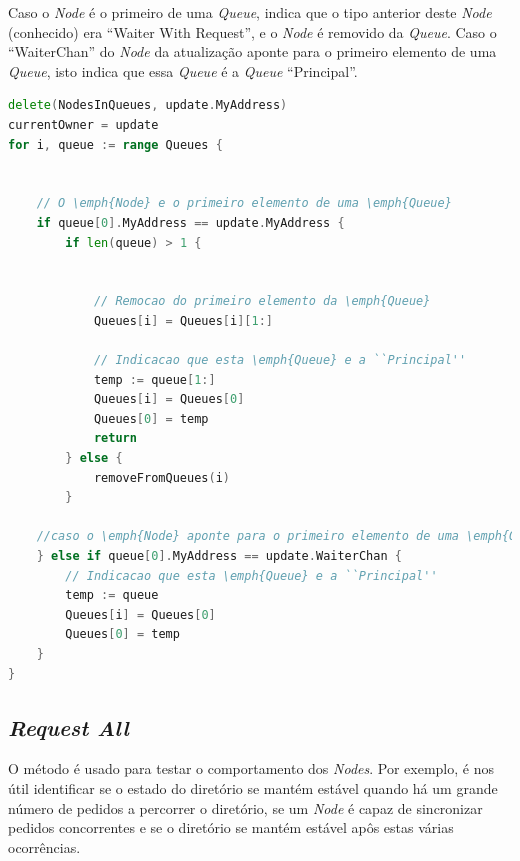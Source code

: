 Caso o \emph{Node} é o primeiro de uma \emph{Queue}, indica que o tipo anterior deste \emph{Node} (conhecido) era ``Waiter With Request'', e o \emph{Node} é removido da \emph{Queue}.
Caso o ``WaiterChan'' do \emph{Node} da atualização aponte para o primeiro elemento de uma \emph{Queue}, isto indica que essa \emph{Queue} é a \emph{Queue} ``Principal''.


\begin{lstlisting}[caption={ Alterações nas filas caso o \emph{Node} seja do tipo ``Owner With Request'' },language=Go]
delete(NodesInQueues, update.MyAddress)
currentOwner = update
for i, queue := range Queues {


	// O \emph{Node} e o primeiro elemento de uma \emph{Queue} 
	if queue[0].MyAddress == update.MyAddress {
		if len(queue) > 1 {


			// Remocao do primeiro elemento da \emph{Queue}
			Queues[i] = Queues[i][1:]

			// Indicacao que esta \emph{Queue} e a ``Principal''
			temp := queue[1:]
			Queues[i] = Queues[0]
			Queues[0] = temp
			return
		} else {
			removeFromQueues(i)
		}

	//caso o \emph{Node} aponte para o primeiro elemento de uma \emph{Queue}
	} else if queue[0].MyAddress == update.WaiterChan {
		// Indicacao que esta \emph{Queue} e a ``Principal''
		temp := queue
		Queues[i] = Queues[0]
		Queues[0] = temp
	}
}


\end{lstlisting}

\subsection*{\emph{Request All}}

O método é usado para testar o comportamento dos \emph{Nodes}.
Por exemplo, é nos útil identificar se o estado do diretório se mantém estável quando há um grande número de
pedidos a percorrer o diretório, se um \emph{Node} é capaz de sincronizar pedidos concorrentes e se o diretório se mantém estável apôs estas várias ocorrências.

